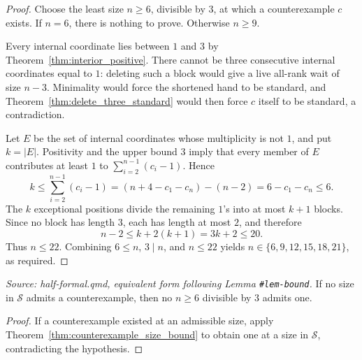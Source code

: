 \begin{proof}

\leanok
  Choose the least size \(n\geq6\), divisible by \(3\), at which a
  counterexample \(c\) exists.  If \(n=6\), there is nothing to prove.
  Otherwise \(n\geq9\).

  Every internal coordinate lies between \(1\) and \(3\) by
  Theorem~\ref{thm:interior_positive}.  There cannot be three consecutive
  internal coordinates equal to \(1\): deleting such a block would give a
  live all-rank wait of size \(n-3\).  Minimality would force the shortened
  hand to be standard, and
  Theorem~\ref{thm:delete_three_standard} would then force \(c\) itself to
  be standard, a contradiction.

  Let \(E\) be the set of internal coordinates whose multiplicity is not
  \(1\), and put \(k=|E|\).  Positivity and the upper bound \(3\) imply
  that every member of \(E\) contributes at least \(1\) to
  \(\sum_{i=2}^{n-1}(c_i-1)\).  Hence
  \[
    k\leq\sum_{i=2}^{n-1}(c_i-1)
      =(n+4-c_1-c_n)-(n-2)
      =6-c_1-c_n\leq6.
  \]
  The \(k\) exceptional positions divide the remaining \(1\)'s into at
  most \(k+1\) blocks.  Since no block has length \(3\), each has length
  at most \(2\), and therefore
  \[
    n-2\leq k+2(k+1)=3k+2\leq20.
  \]
  Thus \(n\leq22\).  Combining \(6\leq n\), \(3\mid n\), and
  \(n\leq22\) yields \(n\in\{6,9,12,15,18,21\}\), as required.
\end{proof}

\begin{corollary}
  \label{cor:no_counterexample}
  \textit{Source: half-formal.qmd, equivalent form following Lemma
  \texttt{\#lem-bound}.}
  If no size in \(\mathcal S\) admits a counterexample, then no
  \(n\geq6\) divisible by \(3\) admits one.
\end{corollary}
\begin{proof}

\leanok
  If a counterexample existed at an admissible size, apply
  Theorem~\ref{thm:counterexample_size_bound} to obtain one at a size in
  \(\mathcal S\), contradicting the hypothesis.
\end{proof}
